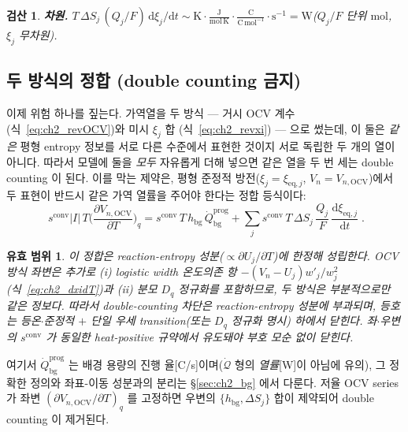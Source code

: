 \documentclass[11pt,a4paper]{article}
\newtheorem*{boundbox}{유효 범위}
\newtheorem*{verifybox}{검산}
\newcommand{\dd}{\mathrm{d}}
\newcommand{\eq}{\mathrm{eq}}
\newcommand{\bg}{\mathrm{bg}}
\newcommand{\OCV}{\mathrm{OCV}}
\newcommand{\conv}{\mathrm{conv}}
\newcommand{\prog}{\mathrm{prog}}
\begin{document}
\begin{verifybox}
\textbf{차원.} $T\,\Delta S_j\,(Q_j/F)\,\dd\xi_j/\dd t\sim\mathrm K\cdot\tfrac{\mathrm J}{\mathrm{mol\,K}}\cdot
\tfrac{\mathrm C}{\mathrm{C\,mol^{-1}}}\cdot\mathrm s^{-1}=\mathrm W$($Q_j/F$ 단위 $\mathrm{mol}$, $\xi_j$ 무차원).
\end{verifybox}

\subsection{두 방식의 정합 (double counting 금지)}\label{sec:ch2_double}
이제 위험 하나를 짚는다. 가역열을 두 방식 — 거시 OCV 계수(식~\eqref{eq:ch2_revOCV})와 미시 $\xi_j$ 합
(식~\eqref{eq:ch2_revxi}) — 으로 썼는데, 이 둘은 \emph{같은} 평형 entropy 정보를 서로 다른 수준에서 표현한 것이지
서로 독립한 두 개의 열이 아니다. 따라서 모델에 둘을 \emph{모두} 자유롭게 더해 넣으면 같은 열을 두 번 세는 double
counting 이 된다. 이를 막는 제약은, 평형 준정적 방전($\xi_j=\xi_{\eq,j}$, $V_n=V_{n,\OCV}$)에서 두 표현이 반드시
같은 가역 열률을 주어야 한다는 정합 등식이다:
\begin{equation}
\boxed{\;s^{\conv}|I|\,T\Big(\frac{\partial V_{n,\OCV}}{\partial T}\Big)_q
=s^{\conv}\,T\,h_\bg\,\dot Q_\bg^{\prog}+\sum_{j}s^{\conv}\,T\,\Delta S_j\,\frac{Q_j}{F}\,\frac{\dd\xi_{\eq,j}}{\dd t}\;.}
\label{eq:ch2_consistency}
\end{equation}
\begin{boundbox}
이 정합은 \emph{reaction-entropy 성분($\propto\partial U_j/\partial T$)에 한정}해 성립한다. OCV 방식 좌변은 추가로
(i) logistic width 온도의존 항 $-(V_n-U_j)w'_j/w_j^2$(식~\eqref{eq:ch2_dxidT})과 (ii) 분모 $D_q$ 정규화를
포함하므로, 두 방식은 \emph{부분적으로만} 같은 정보다. 따라서 double-counting 차단은 reaction-entropy 성분에
부과되며, 등호는 등온$\cdot$준정적 $+$ 단일 우세 transition(또는 $D_q$ 정규화 명시) 하에서 닫힌다. 좌$\cdot$우변의
$s^{\conv}$ 가 \emph{동일한 heat-positive 규약}에서 유도돼야 부호 모순 없이 닫힌다.
\end{boundbox}
여기서 $\dot Q_\bg^{\prog}$ 는 배경 용량의 진행 율[C/s]이며($\dot{\mathcal Q}$ 형의 \emph{열률}[W]이 아님에 유의),
그 정확한 정의와 좌표-이동 성분과의 분리는 \S\ref{sec:ch2_bg} 에서 다룬다. 저율 OCV series 가 좌변
$(\partial V_{n,\OCV}/\partial T)_q$ 를 고정하면 우변의 $\{h_\bg,\Delta S_j\}$ 합이 제약되어 double counting 이
제거된다.

\end{document}
